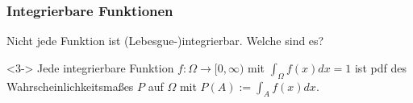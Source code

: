 %
%
%  
%  

\begin{frame}
  \frametitle{Integrierbare Funktionen}
  Nicht jede Funktion ist (Lebesgue-)integrierbar. Welche sind es?
  
  \medskip


\smallskip

  \begin{definition}<3->
    Jede integrierbare Funktion $f \colon \Omega \to [0, \infty)$ mit $\int_\Omega f(x) dx = 1$ ist \alert{pdf} des Wahrscheinlichkeitsmaßes $P$ auf $\Omega$ mit $P(A) := \int_A f(x)dx$.
  \end{definition}
\end{frame}


